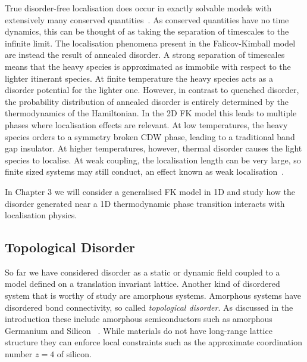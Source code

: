 True disorder-free localisation does occur in exactly solvable models with extensively many conserved quantities~\autocite{smithDisorderFreeLocalization2017}. As conserved quantities have no time dynamics, this can be thought of as taking the separation of timescales to the infinite limit. The localisation phenomena present in the Falicov-Kimball model are instead the result of annealed disorder. A strong separation of timescales means that the heavy species is approximated as immobile with respect to the lighter itinerant species. At finite temperature the heavy species acts as a disorder potential for the lighter one. However, in contrast to quenched disorder, the probability distribution of annealed disorder is entirely determined by the thermodynamics of the Hamiltonian. In the 2D FK model this leads to multiple phases where localisation effects are relevant. At low temperatures, the heavy species orders to a symmetry broken CDW phase, leading to a traditional band gap insulator. At higher temperatures, however, thermal disorder causes the light species to localise. At weak coupling, the localisation length can be very large, so finite sized systems may still conduct, an effect known as weak localisation~\autocite{antipovInteractionTunedAndersonMott2016}.

In Chapter 3 we will consider a generalised FK model in 1D and study how the disorder generated near a 1D thermodynamic phase transition interacts with localisation physics.

\hypertarget{topological-disorder}{%
\subsection{Topological Disorder}\label{topological-disorder}}

So far we have considered disorder as a static or dynamic field coupled to a model defined on a translation invariant lattice. Another kind of disordered system that is worthy of study are amorphous systems. Amorphous systems have disordered bond connectivity, so called \emph{topological disorder}. As discussed in the introduction these include amorphous semiconductors such as amorphous Germanium and Silicon ~\autocite{Yonezawa1983,zallen2008physics,Weaire1971,betteridge1973possible}. While materials do not have long-range lattice structure they can enforce local constraints such as the approximate coordination number \(z = 4\) of silicon.

